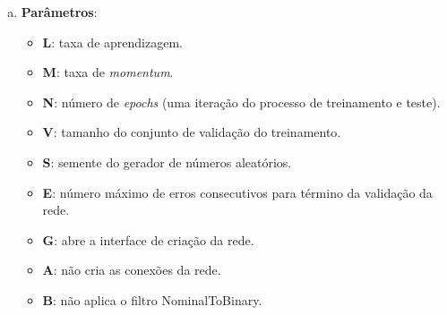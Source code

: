 \begin{enumerate}[a)]
    \item \textbf{Parâmetros}:
        \begin{itemize}

            \item \textbf{L}: taxa de aprendizagem.

            \item \textbf{M}: taxa de \emph{momentum}.

            \item \textbf{N}: número de \emph{epochs} (uma iteração do processo de treinamento e teste).

            \item \textbf{V}: tamanho do conjunto de validação do treinamento.

            \item \textbf{S}: semente do gerador de números aleatórios.

            \item \textbf{E}: número máximo de erros consecutivos para término da validação da rede.

            \item \textbf{G}: abre a interface de criação da rede.

            \item \textbf{A}: não cria as conexões da rede.

            \item \textbf{B}: não aplica o filtro NominalToBinary.

\end{itemize}
\end{enumerate}
